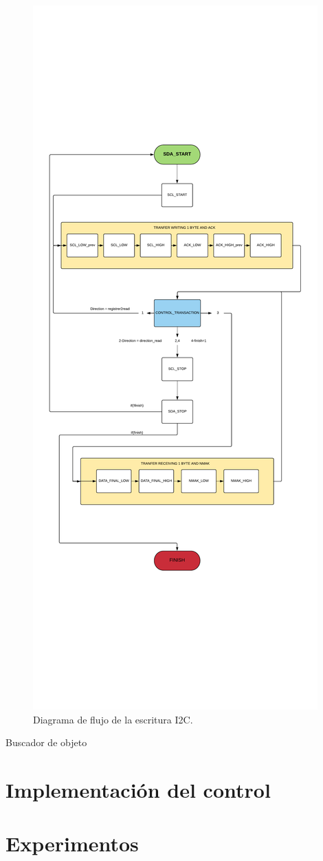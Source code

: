 \begin{figure}[H]
	\center
	\includegraphics[trim = 0mm 0mm 0mm 0mm, clip,scale=0.5]{imagenes/Cuadricoptero_vision/I2C_WRITE.pdf}
	\caption{Diagrama de flujo de la escritura I2C.}
	\label{fig:i2c_write}
\end{figure}


Buscador de objeto


\section{Implementación del control}
\section{Experimentos}









